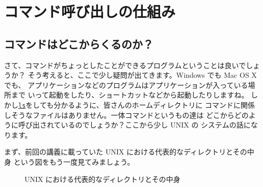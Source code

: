 \documentclass[a4j]{ltjreport}
\begin{document}
    \section{コマンド呼び出しの仕組み}

    \subsection{コマンドはどこからくるのか？}
    さて、コマンドがちょっとしたことができるプログラムということは良いでしょうか？
    そう考えると、ここで少し疑問が出てきます。Windows でも Mac OS X でも、
    アプリケーションなどのプログラムはアプリケーションが入っている場所まで
    いって起動をしたり、ショートカットなどから起動したりしますね。
    しかし\underline{\texttt{ls}}をしても分かるように、皆さんのホームディレクトリに
    コマンドに関係しそうなファイルはありません。一体コマンドというもの達は
    どこからどのように呼び出されているのでしょうか？ここから少し UNIX の
    システムの話になります。

    まず、前回の講義に載っていた UNIX における代表的なディレクトリとその中身
    という図をもう一度見てみましょう。
    \begin{figure}[htbp]
        \centering
        \caption{UNIX における代表的なディレクトリとその中身}
        \label{fig:dir}
    \end{figure}
\end{document}
